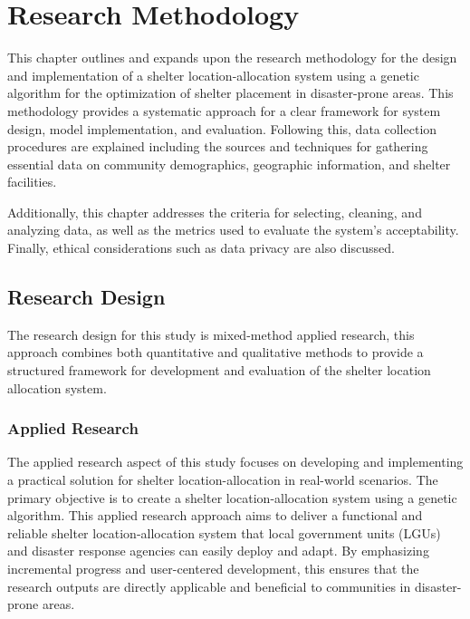 \chapter{Research Methodology}

	This chapter outlines and expands upon the research methodology for the design and implementation of a shelter location-allocation system using a genetic algorithm for the optimization of shelter placement in disaster-prone areas. This methodology provides a systematic approach for a clear framework for system design, model implementation, and evaluation. Following this, data collection procedures are explained including the sources and techniques for gathering essential data on community demographics, geographic information, and shelter facilities.
	
	Additionally, this chapter addresses the criteria for selecting, cleaning, and analyzing data, as well as the metrics used to evaluate the system’s acceptability. Finally, ethical considerations such as data privacy are also discussed.

\section{Research Design}
	The research design for this study is mixed-method applied research, this approach combines both quantitative and qualitative methods to provide a structured framework for development and evaluation of the shelter location allocation system.

\subsection{Applied Research}
	The applied research aspect of this study focuses on developing and implementing a practical solution for shelter location-allocation in real-world scenarios. The primary objective is to create a shelter location-allocation system using a genetic algorithm.
	This applied research approach aims to deliver a functional and reliable shelter location-allocation system that local government units (LGUs) and disaster response agencies can easily deploy and adapt. By emphasizing incremental progress and user-centered development, this ensures that the research outputs are directly applicable and beneficial to communities in disaster-prone areas.

